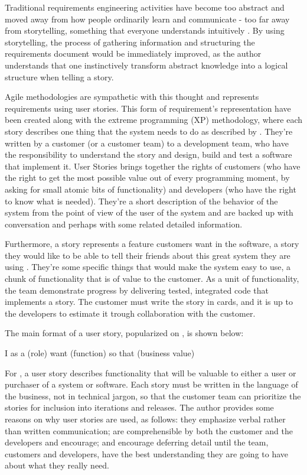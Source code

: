 Traditional requirements engineering activities have become too abstract and moved away from how people ordinarily learn and communicate - too far away from storytelling, something that everyone understands intuitively \cite{Rinzler_2009}. By using storytelling, the process of gathering information and structuring the requirements document would be immediately improved, as the author understands that one instinctively transform abstract knowledge into a logical structure when telling a story. 

Agile methodologies are sympathetic with this thought and represents requirements using user stories. This form of requirement's representation have been created along with the extreme programming (XP) methodology, where each story describes one thing that the system needs to do as described by \cite{Jeffries_2000}. They're written by a customer (or a customer team) to a development team, who have the responsibility to understand the story and design, build and test a software that implement it. User Stories brings together the rights of customers (who have the right to get the most possible value out of every programming moment, by asking for small atomic bits of functionality) and developers (who have the right to know what is needed). They're a short description of the behavior of the system from the point of view of the user of the system and are backed up with conversation and perhaps with some related detailed information. 

Furthermore, a story represents a feature customers want in the software, a story they would like to be able to tell their friends about this great system they are using \cite{Beck_Fowler_2000}. They're some specific things that would make the system easy to use, a chunk of functionality that is of value to the customer. As a unit of functionality, the team demonstrate progress by delivering tested, integrated code that implements a story. The customer must write the story in cards, and it  is up to the developers to estimate it trough collaboration with the customer.

The main format of a user story, popularized on \cite{Cohn_2004}, is shown below:

\begin{framed}

\center I as a (role) want (function) so that (business value)

\end{framed}

For \cite{Cohn_2004}, a user story describes functionality that will be valuable to either a user or purchaser of a system or software. Each story must be written in the language of the business, not in technical jargon, so that the customer team can prioritize the stories for inclusion into iterations and releases. The author provides some reasons on why user stories are used, as follows: they emphasize verbal rather than written communication; are comprehensible by both the customer and the developers and encourage; and encourage deferring detail until the team, customers and developers, have the best understanding they are going to have about what they really need.

